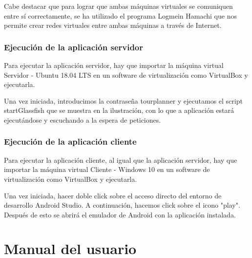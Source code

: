 Cabe destacar que para lograr que ambas máquinas virtuales se comuniquen entre sí correctamente, se ha utilizado el programa Logmein Hamachi que nos permite crear redes virtuales entre ambas máquinas a través de Internet.

\subsubsection{Ejecución de la aplicación servidor}

Para ejecutar la aplicación servidor, hay que importar la máquina virtual Servidor - Ubuntu 18.04 LTS en un software de virtualización como VirtualBox y ejecutarla.

Una vez iniciada, introducimos la contraseña tourplanner y ejecutamos el script startGlassfish que se muestra en la ilustración, con lo que a aplicación estará ejecutándose y escuchando a la espera de peticiones.



\subsubsection{Ejecución de la aplicación cliente}

Para ejecutar la aplicación cliente, al igual que la aplicación servidor, hay que importar la máquina virtual Cliente - Windows 10 en un software de virtualización como VirtualBox y ejecutarla.

Una vez iniciada, hacer doble click sobre el acceso directo del entorno de desarrollo Android Studio. A continuación, hacemos click sobre el icono "play". Después de esto se abrirá el emulador de Android con la aplicación instalada.

\section{Manual del usuario}


